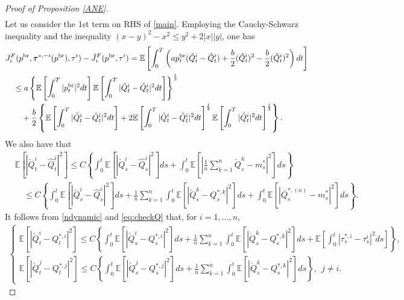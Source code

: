 \documentclass[11pt]{article}
\numberwithin{equation}{section}
\begin{document}
\begin{proof}[Proof of Proposition \ref{ANE}]
\begin{align}
\end{align}
Let us consider the 1st term on RHS of \eqref{main}. Employing the Cauchy-Schwarz inequality and the inequality $(x-y)^2-x^2\leq y^2+2|x||y|$, one has
\begin{align}\label{term1}&J_i^F(p^{{\rm br}},\boldsymbol{\tau}^{*,-i}(p^{{\rm br}}), \tau^i)-\tilde{J}_i^F(p^{{\rm br}}, \tau^i)=\mathbb{E}\left[\int_0^T\left(ap_t^{{\rm br}}(\check{Q}_t^i-\hat{Q}_t^i)+\frac{b}{2}(\hat{Q}_t^i)^2-\frac{b}{2}(\check{Q}_t^i)^2\right)dt\right]\nonumber\\
&\quad\leq a\left\{\mathbb{E}\left[\int_0^T|p_t^{{\rm br}}|^2dt\right]\mathbb{E}\left[\int_0^T|\check{Q}_t^i-\hat{Q}_t^i|^2dt\right]\right\}^{\frac{1}{2}}\nonumber\\
&\qquad+\frac{b}{2}\left\{\mathbb{E}\left[\int_0^T|\check{Q}_t^i-\hat{Q}_t^i|^2dt\right]+2\mathbb{E}\left[\int_0^T|\check{Q}_t^i-\hat{Q}_t^i|^2dt\right]^{\frac{1}{2}}\mathbb{E}\left[\int_0^T|\hat{Q}_t^i|^2dt\right]^{\frac{1}{2}}\right\}.
\end{align}
We also have that 
\begin{align}\label{checkhatQ}
&\mathbb{E}\left[|\check{Q}_t^i-\hat{Q}_t^i|^2\right]\leq C\left\{ \int_0^t\mathbb{E}\left[|\check{Q}_s^i-\hat{Q}_s^i|^2\right]ds+\int_0^t\mathbb{E}\left[\left|\frac{1}{n}\sum_{k=1}^n\check{Q}_s^k-m_s^*\right|^2\right]ds\right\}\\
&\quad \leq C\left\{ \int_0^t\mathbb{E}\left[|\check{Q}_s^i-\hat{Q}_s^i|^2\right]ds+\frac{1}{n}\sum_{k=1}^n\int_0^t\mathbb{E}\left[|\check{Q}_s^k-Q_s^{*,k}|^2\right]ds+\int_0^t\mathbb{E}\left[|\overline{Q}_s^{*,(n)}-m_s^*|^2\right]ds\right\}.\nonumber
\end{align}
It follows from \eqref{ndynamic} and \eqref{eq:checkQ} that, for $i=1,\ldots,n$,
\begin{align*}
\begin{cases}
\displaystyle\mathbb{E}\left[|\check{Q}_t^i-Q_t^{*,i}|^2\right]	\leq C\left\{ \int_0^t\mathbb{E}\left[|\check{Q}_s^i-Q_s^{*,i}|^2\right]ds+\frac{1}{n}\sum_{k=1}^n\int_0^t\mathbb{E}\left[|\check{Q}_s^k-Q_s^{*,k}|^2\right]ds+\mathbb{E}\left[\int_0^t|\tau_s^{*,i}-\tau_s^i|^2ds\right]\right\},\\[0.6em]
\displaystyle\mathbb{E}\left[|\check{Q}_t^j-Q_t^{*,j}|^2\right]\leq C\left\{ \int_0^t\mathbb{E}\left[|\check{Q}_s^j-Q_s^{*,j}|^2\right]ds+\frac{1}{n}\sum_{k=1}^n\int_0^t\mathbb{E}\left[|\check{Q}_s^k-Q_s^{*,k}|^2\right]ds\right\},~~j\neq i.
\end{cases}
\end{align*}

\end{proof}
\end{document}
